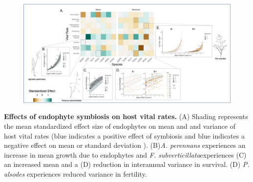 \documentclass[12pt]{article}
\begin{document}



\clearpage


\begin{figure}
	\centering
	\includegraphics[width=\linewidth]{StochDemo_fig1.png}
\end{figure}
 \textbf{Effects of endophyte symbiosis on host vital rates.} (A) Shading represents the mean standardized effect size of endophytes on mean and and variance of host vital rates (blue indicates a positive effect of symbiosis and blue indicates a negative effect on mean or standard deviation ). (B)\emph{A. perennans} experiences an increase in mean growth due to endophytes and \emph{F. subverticillata}experiences  (C) an increased mean and a (D) reduction in interannual variance in survival. (D) \emph{P. alsodes} experiences reduced variance in fertility.
\newpage
\end{document}
